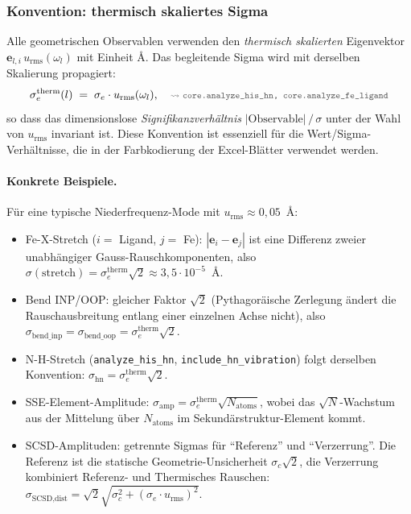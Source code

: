 \documentclass[11pt,a4paper,twoside]{article}
\newcommand{\evec}{\mathbf{e}}
\newcommand{\urms}{u_{\mathrm{rms}}}
\newcommand{\codref}[1]{%
  \quad\text{\textcolor{gray!70!black}{\footnotesize $\rightsquigarrow$~\texttt{#1}}}}
\theoremstyle{remark}
\begin{document}
\subsubsection*{Konvention: thermisch skaliertes Sigma}
\label{sec:uncertainty-convention}

Alle geometrischen Observablen verwenden den \emph{thermisch
skalierten} Eigenvektor $\evec_{l,i}\,\urms(\omega_l)$ mit
Einheit \AA{}. Das begleitende Sigma wird mit derselben Skalierung
propagiert:
\begin{equation}
  \sigma_e^\text{therm}(l) \;=\; \sigma_e \cdot \urms(\omega_l),
  \codref{core.analyze\_his\_hn, core.analyze\_fe\_ligand}
  \label{eq:sigma-therm}
\end{equation}
so dass das dimensionslose \emph{Signifikanzverh\"altnis}
$|\text{Observable}|\,/\,\sigma$ unter der Wahl von $\urms$ invariant
ist. Diese Konvention ist essenziell f\"ur die Wert/Sigma-Verh\"altnisse,
die in der Farbkodierung der Excel-Bl\"atter verwendet werden.

\paragraph{Konkrete Beispiele.} F\"ur eine typische Niederfrequenz-Mode
mit $\urms \approx 0{,}05$~\AA{}:
\begin{itemize}\setlength{\itemsep}{0pt}
  \item Fe-X-Stretch ($i = $ Ligand, $j = $ Fe):
        $|\evec_i - \evec_j|$ ist eine Differenz zweier unabh\"angiger
        Gauss-Rauschkomponenten, also
        $\sigma(\text{stretch}) = \sigma_e^\text{therm}\sqrt{2}
        \approx 3{,}5\cdot 10^{-5}$~\AA.
  \item Bend INP/OOP: gleicher Faktor $\sqrt{2}$ (Pythagor\"aische
        Zerlegung \"andert die Rauschausbreitung entlang einer
        einzelnen Achse nicht), also $\sigma_\text{bend\_inp}
        = \sigma_\text{bend\_oop} = \sigma_e^\text{therm}\sqrt{2}$.
  \item N-H-Stretch (\texttt{analyze\_his\_hn},
        \texttt{include\_hn\_vibration}) folgt derselben Konvention:
        $\sigma_\text{hn} = \sigma_e^\text{therm}\sqrt{2}$.
  \item SSE-Element-Amplitude:
        $\sigma_\text{amp} = \sigma_e^\text{therm}\sqrt{N_\text{atoms}}$,
        wobei das $\sqrt{N}$-Wachstum aus der Mittelung \"uber
        $N_\text{atoms}$ im Sekund\"arstruktur-Element kommt.
  \item SCSD-Amplituden: getrennte Sigmas f\"ur ``Referenz'' und
        ``Verzerrung''. Die Referenz ist die statische
        Geometrie-Unsicherheit $\sigma_c\sqrt{2}$, die Verzerrung
        kombiniert Referenz- und Thermisches Rauschen:
        $\sigma_\text{SCSD,dist}
         = \sqrt{2}\sqrt{\sigma_c^2 + (\sigma_e \cdot \urms)^2}$.
\end{itemize}
\end{document}
